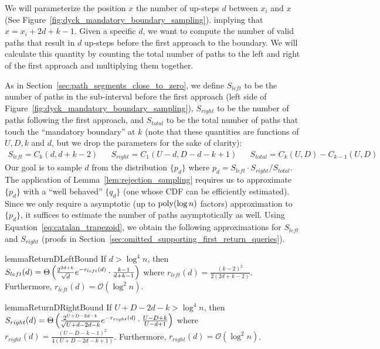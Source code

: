 We will parameterize the position $x$ the number of up-steps $d$ between $x_i$ and $x$ (See Figure~\ref{fig:dyck_mandatory_boundary_sampling}).
implying that $x = x_{i} + 2d + k - 1$.
Given a specific $d$, we want to compute the number of valid paths that result in
$d$ up-steps before the first approach to the boundary.
We will calculate this quantity by counting the total number of paths to the left and right
of the first approach and multiplying them together.

As in Section~\ref{sec:path_segments_close_to_zero}, we define
$S_{left}$ to be the number of paths in the sub-interval before the first approach (left side of Figure~\ref{fig:dyck_mandatory_boundary_sampling}),
$S_{right}$ to be the number of paths following the first approach,
and $S_{total}$ to be the total number of paths that touch the ``mandatory boundary'' at $k$
(note that these quantities are functions of $U,D,k$ and $d$, but we drop the parameters for the sake of clarity):
{\small
\begin{align*}
    S_{left} = C_{k}(d, d+k-2)
    &&S_{right} = C_1(U-d, D-d-k+1)
    &&S_{total} = C_k(U,D) - C_{k-1}(U,D)
\end{align*}}
Our goal is to sample $d$ from the distribution $\{ p_d\}$ where $p_d = S_{left}\cdot S_{right}/S_{total}$.
The application of Lemma~\ref{lem:rejection_sampling} requires us to approximate $\{p_d\}$
with a ``well behaved'' $\{q_d\}$ (one whose CDF can be efficiently estimated).
Since we only require a asymptotic (up to $\mathrm{poly}(\log n)$ factors) approximation to $\{p_d\}$,
it suffices to estimate the number of paths asymptotically as well.
Using Equation~\ref{eq:catalan_trapezoid}, we obtain the following approximations for $S_{left}$ and $S_{right}$
(proofs in Section~\ref{sec:omitted_supporting_first_return_queries}).
\begin{restatable}{lemma}{ReturnDLeftBound}
\label{lem:ReturnDLeftBound}
If $d > \log^4 n$, then $S_{left}(d)
= \Theta\left( \frac{2^{2d+k}}{\sqrt{d}}\mathlarger e^{-r_{left}(d)}\cdot \frac{k-1}{d+k-1}\right)$
where $r_{left}(d) = \frac{(k-2)^2}{2(2d+k-2)}$.
Furthermore, $r_{left}(d)=\mathcal O(\log^2 n)$.
\end{restatable}

\begin{restatable}{lemma}{ReturnDRightBound}
\label{lem:ReturnDRightBound}
If $U+D-2d-k > \log^4 n$, then $S_{right}(d)
= \Theta\left( \frac{2^{U+D-2d-k}}{\sqrt{U+d-2d-k}}\mathlarger e^{-r_{right}(d)}\cdot \frac{U-D+k}{U-d+1}\right)$
where $r_{right}(d) = \frac{(U-D-k-1)^2}{4(U+D-2d-k+1)}$.
Furthermore, $r_{right}(d)=\mathcal O(\log^2 n)$.
\end{restatable}

